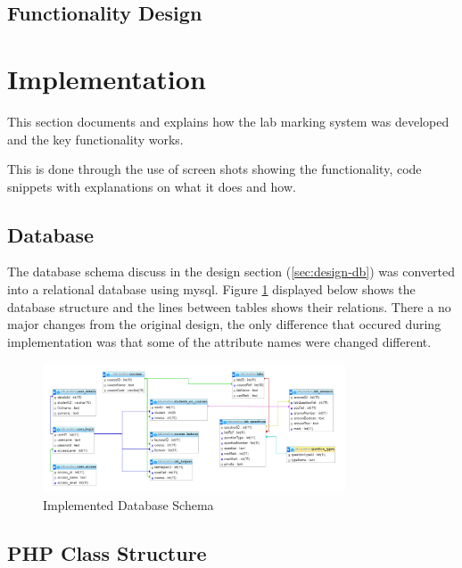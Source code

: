 \documentclass[12pt]{article}  %
\begin{document}
\subsection{Functionality Design}







\newpage
\section{Implementation}
This section documents and explains how the lab marking system was developed and the key functionality works. 

This is done through the use of screen shots showing the functionality, code snippets with explanations on what it does and how.   

\subsection{Database}

The database schema discuss in the design section (\ref{sec:design-db}) was converted into a relational database using mysql. Figure \ref{fig:implement-db} displayed below shows the database structure and the lines between tables shows their relations. There a no major changes from the original design, the only difference that occured during implementation was that some of the attribute names were changed different.  

\begin{figure}[H]
    \centering
    \includegraphics[width=0.8\textwidth]{images/implementation/database.png}
    \caption{Implemented Database Schema}
    \label{fig:implement-db}
\end{figure}

\subsection{PHP Class Structure}
\end{document}
